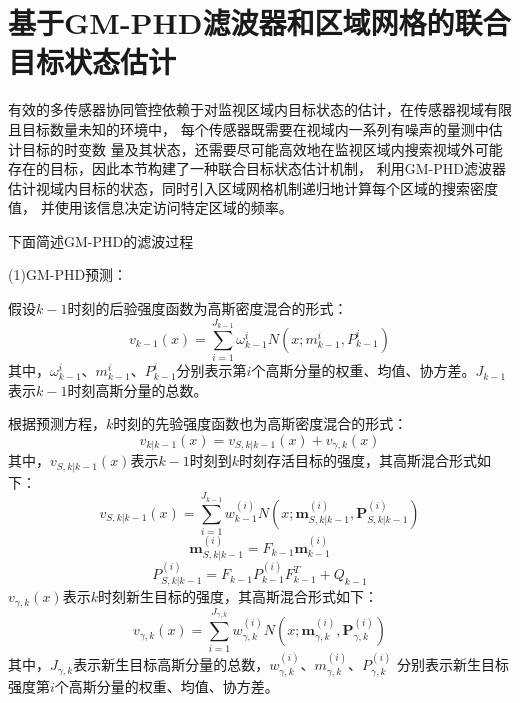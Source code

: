 \section{基于GM-PHD滤波器和区域网格的联合目标状态估计}
有效的多传感器协同管控依赖于对监视区域内目标状态的估计，在传感器视域有限且目标数量未知的环境中，
每个传感器既需要在视域内一系列有噪声的量测中估计目标的时变数
量及其状态，还需要尽可能高效地在监视区域内搜索视域外可能存在的目标，因此本节构建了一种联合目标状态估计机制，
利用GM-PHD滤波器估计视域内目标的状态，同时引入区域网格机制递归地计算每个区域的搜索密度值，
并使用该信息决定访问特定区域的频率。

下面简述GM-PHD的滤波过程

(1)GM-PHD预测：

假设$k-1$时刻的后验强度函数为高斯密度混合的形式：
\begin{equation}
    v_{k-1}(x)=\sum_{i=1}^{J_{k-1}}\omega_{k-1}^iN(x;m_{k-1}^i,P_{k-1}^i)
    \label{eq:集积分公式}
\end{equation}
其中，$\omega_{k-1}^i$、$m_{k-1}^i$、$P_{k-1}^i$分别表示第$i$个高斯分量的权重、均值、协方差。$J_{k-1}$表示$k-1$时刻高斯分量的总数。

根据预测方程，$k$时刻的先验强度函数也为高斯密度混合的形式：
\begin{equation}
    v_{k|k-1}(x)=v_{S,k|k-1}(x)+v_{\gamma,k}(x)
\end{equation}
其中，$v_{S,k|k-1}(x)$表示$k-1$时刻到$k$时刻存活目标的强度，其高斯混合形式如下：
 \begin{equation}
    v_{S,k|k-1}(x)=\sum_{i=1}^{J_{k-1}}w_{k-1}^{(i)}N\left(x;\boldsymbol{m}_{S,k|k-1}^{(i)},\boldsymbol{P}_{S,k|k-1}^{(i)}\right)
\end{equation}
\begin{equation}
    \boldsymbol{m}_{S,k|k-1}^{(i)}=F_{k-1}\boldsymbol{m}_{k-1}^{(i)}
\end{equation}
\begin{equation}
    P_{S,k|k-1}^{(i)}=F_{k-1}P_{k-1}^{(i)}F_{k-1}^{T}+Q_{k-1}
\end{equation}
$v_{\gamma,k}(x)$表示$k$时刻新生目标的强度，其高斯混合形式如下：
\begin{equation}
    v_{\gamma,k}(x)=\sum_{i=1}^{J_{\gamma,k}}w_{\gamma,k}^{(i)}N\left(x;\boldsymbol{m}_{\gamma,k}^{(i)},\boldsymbol{P}_{\gamma,k}^{(i)}\right)
\end{equation}
其中，$J_{\gamma,k}$表示新生目标高斯分量的总数，$w_{\gamma,k}^{(i)}$、$m_{\gamma,k}^{(i)}$、$P_{\gamma,k}^{(i)}$
分别表示新生目标强度第$i$个高斯分量的权重、均值、协方差。

